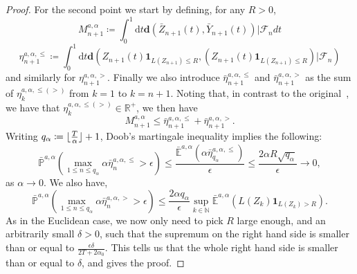 \documentclass{article}
\newcommand{\rd}{\mathrm{d}}
\newcommand{\bd}{\mathbf{d}}
\DeclarePairedDelimiter\floor{\lfloor}{\rfloor}
\begin{document}
\begin{proof}
For the second point we start by defining, for any $R>0$,
\begin{equation}
    M^{a,\alpha}_{n+1}\coloneqq \int_0^1\rd t \bd\left(\bar{Z}_{n+1}(t),\bar Y_{n+1}(t)\right)|\mathcal{F}_n dt
\end{equation}
\begin{equation}
    \eta_{n+1}^{a,\alpha,\leq}\coloneqq \int_0^1\rd t \bd\left(Z_{n+1}(t)\mathbf{1}_{L(Z_{n+1})\leq R},(Z_{n+1}(t)\mathbf{1}_{L(Z_{n+1})\leq R})|\mathcal{F}_n\right)
\end{equation}
and similarly for $\eta_{n+1}^{a,\alpha,>}$. 
Finally we also introduce $\bar\eta_{n+1}^{a,\alpha,\leq}$ and $\bar\eta_{n+1}^{a,\alpha,>}$ as the sum of $\eta_{k}^{a,\alpha,\leq(>)}$ from $k=1$ to $k=n+1$. Noting that, in contrast to the original~\cite{bianchi2019constant}, we have that $\eta_{k}^{a,\alpha,\leq(>)}\in\mathbb{R}^+$, we then have
\begin{equation}
    M^{a,\alpha}_{n+1}\leq \bar\eta_{n+1}^{a,\alpha,\leq}+\bar\eta_{n+1}^{a,\alpha,>}. 
\end{equation}
Writing $q_{\alpha}\coloneqq \floor{\tfrac{T}{\alpha}}+1$, Doob's martingale inequality implies the following:
\begin{equation}
    \bar{\mathbb{P}}^{a,\alpha}\left(\max_{1\leq n\leq q_{\alpha}}\alpha\bar\eta^{a,\alpha,\leq}_{n}>\epsilon\right)\leq \frac{\bar{\mathbb{E}}^{a,\alpha}\left(\alpha\bar\eta_{q_\alpha}^{a,\alpha,\leq}\right)}{\epsilon}\leq\frac{2\alpha R\sqrt{q_\alpha}}{\epsilon}\to 0,
\end{equation}
as $\alpha\to 0$. We also have, 
\begin{equation}
    \bar{\mathbb{P}}^{a,\alpha}\left(\max_{1\leq n\leq q_\alpha}\alpha\bar\eta_{n}^{a,\alpha,>}>\epsilon\right)\leq\frac{2\alpha q_\alpha}{\epsilon}\sup_{k\in\mathbb{N}}\bar{\mathbb{E}}^{a,\alpha}\left(L(Z_k)\mathbf{1}_{L(Z_k)>R}\right).
\end{equation}
As in the Euclidean case, we now only need to pick $R$ large enough, and an arbitrarily small $\delta>0$, such that the supremum on the right hand side is smaller than or equal to $\frac{\epsilon\delta}{2T+2\alpha_0}$. This tells us that the whole right hand side is smaller than or equal to $\delta$, and gives the proof. 
\end{proof}

\end{document}
